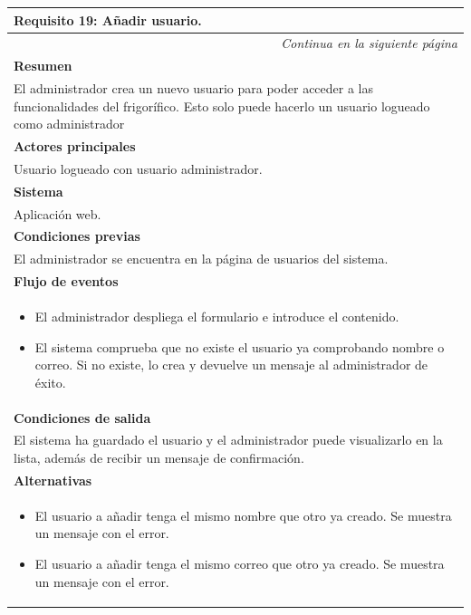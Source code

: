 \begin{longtable}{|p{}|}
\hline
 \rowcolor[gray]{.5}
 \color{white}\textbf{Requisito 19: Añadir usuario.} \\
\hline
\endfirsthead
\endhead
\hline \multicolumn{1}{r}{\textit{Continua en la siguiente página}} \\
\endfoot
\endlastfoot
    \rowcolor[gray]{.9}
     \textbf{Resumen} \\
     \hline
     El administrador crea un nuevo usuario para poder acceder a las funcionalidades del frigorífico. Esto solo puede hacerlo un usuario logueado como administrador \\
     \hline
     \rowcolor[gray]{.9}
     \textbf{Actores principales} \\
     \hline
     Usuario logueado con usuario administrador. \\
     \hline
     \rowcolor[gray]{.9}
     \textbf{Sistema} \\
     \hline
     Aplicación web. \\
     \hline
     \rowcolor[gray]{.9}
     \textbf{Condiciones previas} \\
     \hline
     El administrador se encuentra en la página de usuarios del sistema. \\
     \hline
     \rowcolor[gray]{.9}
     \textbf{Flujo de eventos}  \\
     \hline
      \begin{itemize}
         \item El administrador despliega el formulario e introduce el contenido.
         \item El sistema comprueba que no existe el usuario ya comprobando nombre o correo. Si no existe, lo crea y devuelve un mensaje al administrador de éxito.
     \end{itemize} \\
     \hline
     \rowcolor[gray]{.9}
     \textbf{Condiciones de salida} \\
     \hline
     El sistema ha guardado el usuario y el administrador puede visualizarlo en la lista, además de recibir un mensaje de confirmación. \\
     \hline
     \rowcolor[gray]{.9}
     \textbf{Alternativas}  \\
     \hline
      \begin{itemize}
         \item El usuario a añadir tenga el mismo nombre que otro ya creado. Se muestra un mensaje con el error.
         \item El usuario a añadir tenga el mismo correo que otro ya creado. Se muestra un mensaje con el error.
     \end{itemize} \\
     \hline
\end{longtable}

